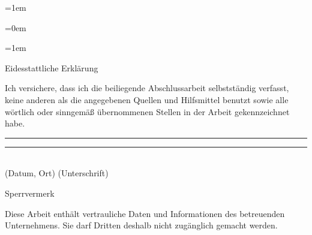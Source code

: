 \documentclass[a4paper,12pt]{article}
\newif\iflistoffigures
\newif\iflistoftables
\newif\ifacronym
\newif\ifsperrvermerk
\begin{document}

\parskip=1em
\parindent=0cm



\normalsize

\pagestyle{fancy}
\fancyhead{}
\fancyhead[LO,RE]{\textsc{\Titel}}
\fancyhead[RO,LE]{\thepage}
\fancyfoot[CO,CE]{}
\setlength{\headheight}{15pt}

\begin{spacing}{1.0} %
\parskip=0em
\newpage

\setcounter{tocdepth}{2}
\renewcommand{\contentsname}{Gliederung}
\tableofcontents 
\newpage

\iflistoftables
\listoftables 
\newpage
\fi

\iflistoffigures
\listoffigures 
\newpage
\fi

\ifacronym

\fi

\parskip=1em
\end{spacing} 

\clearpage


\begin{spacing}{1.5} %









\end{spacing}

\clearpage

\renewcommand{\refname}{Literatur-- und Quellenverzeichnis}
%
%



\onehalfspacing
\clearpage


\vspace*{\fill}
\vfill
\vfill
\begin{center}
{\Large Eidesstattliche Erklärung}
\end{center}
\vfill
\noindent
Ich versichere, dass ich die beiliegende Abschlussarbeit selbstständig verfasst, keine anderen als die angegebenen Quellen und Hilfsmittel benutzt sowie alle wörtlich oder sinngemäß übernommenen Stellen in der Arbeit gekennzeichnet habe. 
\vfill
\vfill
\vfill
\rule[0.5ex]{6.5cm}{1pt}
\hspace{1.3cm}
\rule[0.5ex]{6.5cm}{1pt}
\\(Datum, Ort)
\hspace{6.3cm}
(Unterschrift)
\vfill
\vfill
\vfill
\ifsperrvermerk
\begin{center}
{\Large Sperrvermerk}
\end{center}
\vfill
Diese Arbeit enthält vertrauliche Daten und Informationen des betreuenden
Unternehmens. Sie darf Dritten deshalb nicht zugänglich gemacht werden.
\end{document}
